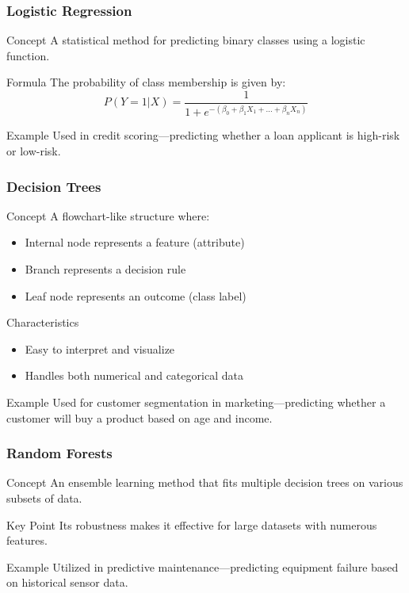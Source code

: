 \documentclass[aspectratio=169]{beamer}
\begin{document}
\begin{frame}[fragile]
    \frametitle{Logistic Regression}
    \begin{block}{Concept}
        A statistical method for predicting binary classes using a logistic function.
    \end{block}
    \begin{block}{Formula}
        The probability of class membership is given by:
        \begin{equation}
        P(Y=1|X) = \frac{1}{1 + e^{-(\beta_0 + \beta_1X_1 + ... + \beta_nX_n)}}
        \end{equation}
    \end{block}
    \begin{block}{Example}
        Used in credit scoring—predicting whether a loan applicant is high-risk or low-risk.
    \end{block}
\end{frame}

\begin{frame}[fragile]
    \frametitle{Decision Trees}
    \begin{block}{Concept}
        A flowchart-like structure where:
        \begin{itemize}
            \item Internal node represents a feature (attribute)
            \item Branch represents a decision rule
            \item Leaf node represents an outcome (class label)
        \end{itemize}
    \end{block}
    \begin{block}{Characteristics}
        \begin{itemize}
            \item Easy to interpret and visualize
            \item Handles both numerical and categorical data
        \end{itemize}
    \end{block}
    \begin{block}{Example}
        Used for customer segmentation in marketing—predicting whether a customer will buy a product based on age and income.
    \end{block}
\end{frame}

\begin{frame}[fragile]
    \frametitle{Random Forests}
    \begin{block}{Concept}
        An ensemble learning method that fits multiple decision trees on various subsets of data.
    \end{block}
    \begin{block}{Key Point}
        Its robustness makes it effective for large datasets with numerous features.
    \end{block}
    \begin{block}{Example}
        Utilized in predictive maintenance—predicting equipment failure based on historical sensor data.
    \end{block}
\end{frame}
\end{document}

